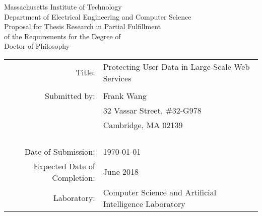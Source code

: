 \thispagestyle{empty}
\def\brule#1{\vrule width#1 height -1.1pt depth 1.5pt\relax}

\def\titleone{Protecting User Data in Large-Scale Web Services}
\def\author{Frank Wang}
\def\addrone{32 Vassar Street, \#32-G978}
\def\addrtwo{Cambridge, MA  02139}

\def\degree{Doctor of Philosophy}
\def\deptname{Electrical Engineering and Computer Science}
\def\laboratory{Computer Science and Artificial Intelligence
  Laboratory}

\def\submissiondate{\today}
\def\completiondate{June 2018}




\begin{center}
{\large \sc   
  Massachusetts Institute of Technology
\\ Department of \deptname \\}
\vspace{.2in}
{\large \sc
   Proposal for Thesis Research in Partial Fulfillment
\\ of the Requirements for the Degree of
\\ \degree \\}
\end{center}

\vspace{.3in}

\def\sig{{\small \sc (Signature of Author)}}

\begin{tabular}{r l c}
   {\small \sc Title:}                       & \multicolumn{2}{l}{\titleone} \\
\\ {\small \sc Submitted by:}
                            & \author  & \\
                            & \addrone & \\
                            & \addrtwo & \\  \\
                            & \cline{1-1} \vspace{-0.2in} &  \\

			                & \makebox[1.8in][c]{\sig} & \\
			    
\\ {\small \sc Date of Submission:}          & \multicolumn{2}{l}{\submissiondate}
\\ {\small \sc Expected Date of Completion:} & \multicolumn{2}{l}{\completiondate}
\\ {\small \sc Laboratory:}                  & \multicolumn{2}{l}{\laboratory}
\end{tabular}

